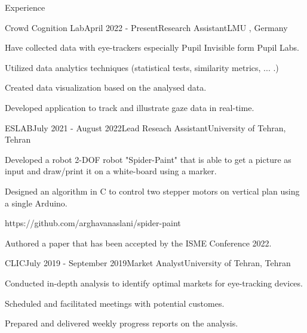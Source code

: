 \documentclass[
	11pt, %
]{resume} %
\begin{document}
\begin{rSection}{Experience}

	\begin{rSubsection}{Crowd Cognition Lab}{April 2022 - Present}{Research Assistant}{LMU , Germany}
		\item Have collected data with eye-trackers especially Pupil Invisible form Pupil Labs.
		\item Utilized data analytics techniques (statistical tests, similarity metrics, ... .)
		\item Created data visualization based on the analysed data.
		\item Developed application to track and illustrate gaze data in real-time.
	\end{rSubsection}




	\begin{rSubsection}{ESLAB}{July 2021 - August 2022}{Lead Reseach Assistant}{University of Tehran, Tehran}
		\item Developed a robot 2-DOF robot "Spider-Paint" that is able to get a picture as input and draw/print it on a white-board using a marker.
		\item Designed an algorithm in C to control two stepper motors on vertical plan using a single Arduino.
		\item https://github.com/arghavanaslani/spider-paint
		\item Authored a paper that has been accepted by the ISME Conference 2022. 
	\end{rSubsection}


	\begin{rSubsection}{CLIC}{July 2019 - September 2019}{Market Analyst}{University of Tehran, Tehran}
		\item Conducted in-depth analysis to identify optimal markets for eye-tracking devices.
		\item Scheduled and facilitated meetings with potential customes.
		\item Prepared and delivered weekly progress reports on the analysis.
	\end{rSubsection}

\end{rSection}
\end{document}
